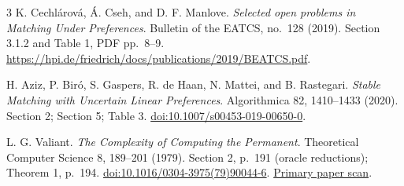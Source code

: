 \documentclass[11pt]{article}
\begin{document}
\begin{thebibliography}{3}
\small
{}
K. Cechl\'arov\'a, \'A. Cseh, and D. F. Manlove.
\emph{Selected open problems in Matching Under Preferences}.
Bulletin of the EATCS, no.~128 (2019).
Section 3.1.2 and Table 1, PDF pp.~8--9.
\url{https://hpi.de/friedrich/docs/publications/2019/BEATCS.pdf}.

H. Aziz, P. Bir\'o, S. Gaspers, R. de Haan, N. Mattei, and B. Rastegari.
\emph{Stable Matching with Uncertain Linear Preferences}.
Algorithmica 82, 1410--1433 (2020).
Section 2; Section 5; Table 3.
\href{https://doi.org/10.1007/s00453-019-00650-0}{doi:10.1007/s00453-019-00650-0}.

L. G. Valiant. \emph{The Complexity of Computing the Permanent}.
Theoretical Computer Science 8, 189--201 (1979).
Section 2, p.~191 (oracle reductions); Theorem 1, p.~194.
\href{https://doi.org/10.1016/0304-3975(79)90044-6}{doi:10.1016/0304-3975(79)90044-6}.
\href{https://www.math.cmu.edu/users/af1p/Teaching/MCC17/Papers/permanent.pdf}{Primary paper scan}.
\end{thebibliography}
\end{document}
